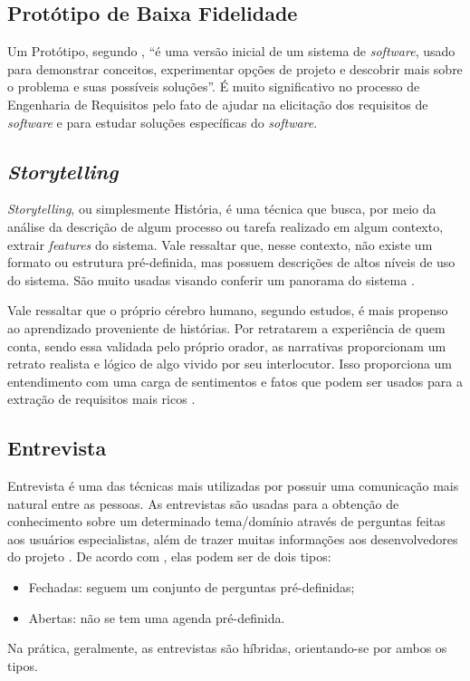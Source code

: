 \subsection{Protótipo de Baixa Fidelidade}

\label{sec:prototipo-def}

Um Protótipo, segundo \cite{Sommerville10}, “é uma versão inicial de um sistema de \textit{software}, usado para demonstrar conceitos, experimentar opções de projeto e descobrir mais sobre o problema e suas possíveis soluções”. É muito significativo no processo de Engenharia de Requisitos pelo fato de ajudar na elicitação dos requisitos de \textit{software} e para estudar soluções específicas do \textit{software}.

\subsection{\textit{Storytelling}}

\label{sec:storytelling}

\textit{Storytelling}, ou simplesmente História, é uma técnica que busca, por meio da análise da descrição de algum processo ou tarefa realizado em algum contexto, extrair \textit{features} do sistema. Vale ressaltar que, nesse contexto, não existe um formato ou estrutura pré-definida, mas possuem descrições de altos níveis de uso do sistema. São muito usadas visando conferir um panorama do sistema  \cite{Sommerville10}.

Vale ressaltar que o próprio cérebro humano, segundo estudos, é mais propenso ao aprendizado proveniente de histórias. Por retratarem a experiência de quem conta, sendo essa validada pelo próprio orador, as narrativas proporcionam um retrato realista e lógico de algo vivido por seu interlocutor. Isso proporciona um entendimento com uma carga de sentimentos e fatos que podem ser usados para a extração de requisitos mais ricos  \cite{storytelling}.

\subsection{Entrevista}

\label{sec:entrevista}

Entrevista é uma das técnicas mais utilizadas por possuir uma comunicação mais natural entre as pessoas. As entrevistas são usadas para a obtenção de conhecimento sobre um determinado tema/domínio através de perguntas feitas aos usuários especialistas, além de trazer muitas informações aos desenvolvedores do projeto \cite{batista2003taxonomia}. De acordo com \cite{Sommerville10}, elas podem ser de dois tipos:
\begin{itemize}
    \item Fechadas: seguem um conjunto de perguntas pré-definidas;
    \item Abertas: não se tem uma agenda pré-definida.
\end{itemize}
Na prática, geralmente, as entrevistas são híbridas, orientando-se por ambos os tipos.

